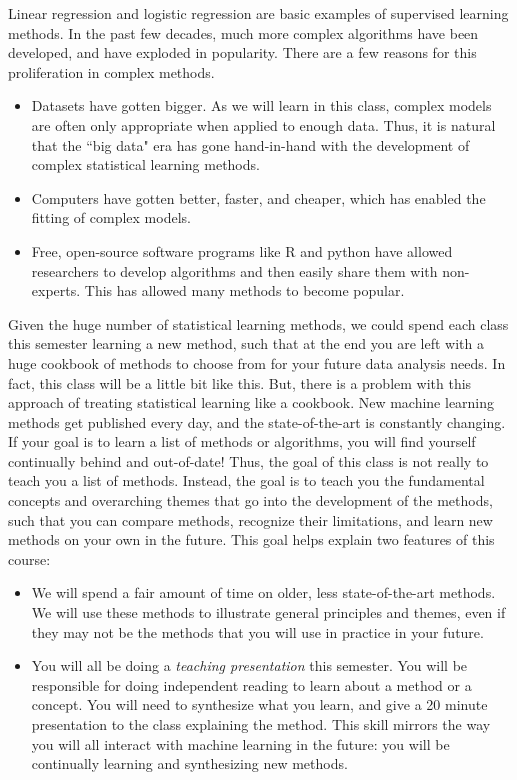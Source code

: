 Linear regression and logistic regression are basic examples of supervised learning methods. In the past few decades, much more complex algorithms have been developed, and have exploded in popularity. There are a few reasons for this proliferation in complex methods. 
\begin{itemize}
\item Datasets have gotten bigger. As we will learn in this class, complex models are often only appropriate when applied to enough data. Thus, it is natural that the ``big data" era has gone hand-in-hand with the development of complex statistical learning methods. 
\item Computers have gotten better, faster, and cheaper, which has enabled the fitting of complex models. 
\item Free, open-source software programs like R and python have allowed researchers to develop algorithms and then easily share them with non-experts. This has allowed many methods to become popular. 
\end{itemize}
Given the huge number of statistical learning methods, we could spend each class this semester learning a new method, such that at the end you are left with a huge cookbook of methods to choose from for your future data analysis needs. In fact, this class will be a little bit like this. But, there is a problem with this approach of treating statistical learning like a cookbook. New machine learning methods get published every day, and the state-of-the-art is constantly changing. If your goal is to learn a list of methods or algorithms, you will find yourself continually behind and out-of-date! Thus, the goal of this class is not really to teach you a list of methods. Instead, the goal is to teach you the fundamental concepts and overarching themes that go into the development of the methods, such that you can compare methods, recognize their limitations, and learn new methods on your own in the future. This goal helps explain two features of this course: 
\begin{itemize}
	\item We will spend a fair amount of time on older, less state-of-the-art methods. We will use these methods to illustrate general principles and themes, even if they may not be the methods that you will use in practice in your future. 
	\item You will all be doing a \emph{teaching presentation} this semester. You will be responsible for doing independent reading to learn about a method or a concept. You will need to synthesize what you learn, and give a 20 minute presentation to the class explaining the method. This skill mirrors the way you will all interact with machine learning in the future: you will be continually learning and synthesizing new methods. 
\end{itemize}


